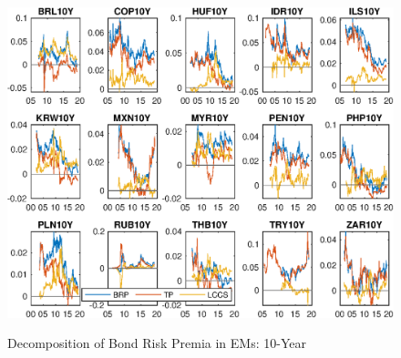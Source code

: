 \documentclass{article}
\begin{document}
\begin{figure}[tbph]
	\begin{center}
		\caption{Decomposition of Bond Risk Premia in EMs: 10-Year}
		\label{fig:brp_dcmp}
		\includegraphics[trim={0cm 0cm 0cm 0cm},clip,height=1\textheight,width=1.4\textwidth]{../Figures/Estimation/brp_dcmp.eps} \\
	\end{center}
\end{figure}
\end{document}
